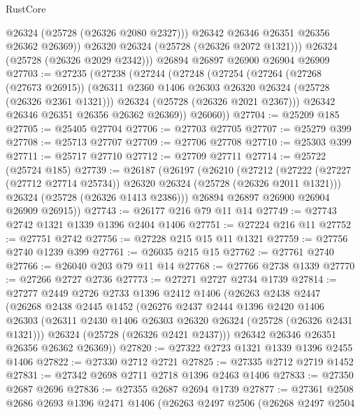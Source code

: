 \begin{lexlean}{RustCore}
\begin{coremodule}
              @26324
              (@25728 (@26326 @2080 @2327)))
            @26342
            @26346
            @26351
            @26356
            @26362
            @26369))
        @26320
        @26324
        (@25728 (@26326 @2072 @1321)))
      @26324
      (@25728 (@26326 @2029 @2342)))
    @26894
    @26897
    @26900
    @26904
    @26909
@27703 := @27235
    (@27238
      (@27244
        (@27248
          (@27254
            (@27264
              (@27268 (@27673 @26915))
              (@26311 @2360 @1406 @26303 @26320 @26324 (@25728 (@26326 @2361 @1321)))
              @26324
              (@25728 (@26326 @2021 @2367)))
            @26342
            @26346
            @26351
            @26356
            @26362
            @26369))
        @26060))
@27704 := @25209 @185
@27705 := @25405 @27704
@27706 := @27703 @27705
@27707 := @25279 @399
@27708 := @25713 @27707
@27709 := @27706 @27708
@27710 := @25303 @399
@27711 := @25717 @27710
@27712 := @27709 @27711
@27714 := @25722 (@25724 @185)
@27739 := @26187
    (@26197
      (@26210
        (@27212
          (@27222 (@27227 (@27712 @27714 @25734)) @26320 @26324 (@25728 (@26326 @2011 @1321)))
          @26324
          (@25728 (@26326 @1413 @2386)))
        @26894
        @26897
        @26900
        @26904
        @26909
        @26915))
@27743 := @26177 @216 @79 @11 @14
@27749 := @27743 @2742 @1321 @1339 @1396 @2404 @1406
@27751 := @27224 @216 @11
@27752 := @27751 @2742
@27756 := @27228 @215 @15 @11 @1321
@27759 := @27756 @2740 @1239 @399
@27761 := @26035 @215 @15
@27762 := @27761 @2740
@27766 := @26040 @203 @79 @11 @14
@27768 := @27766 @2738 @1339
@27770 := @27266 @2727 @2736
@27773 := @27271 @2727 @2734 @1739
@27814 := @27277
    @2449
    @2726
    @2733
    @1396
    @2412
    @1406
    (@26263
      @2438
      @2447
      (@26268
        @2438
        @2445
        @1452
        (@26276
          @2437
          @2444
          @1396
          @2420
          @1406
          @26303
          (@26311 @2430 @1406 @26303 @26320 @26324 (@25728 (@26326 @2431 @1321)))
          @26324
          (@25728 (@26326 @2421 @2437)))
        @26342
        @26346
        @26351
        @26356
        @26362
        @26369))
@27820 := @27322 @2723 @1321 @1339 @1396 @2455 @1406
@27822 := @27330 @2712 @2721
@27825 := @27335 @2712 @2719 @1452
@27831 := @27342 @2698 @2711 @2718 @1396 @2463 @1406
@27833 := @27350 @2687 @2696
@27836 := @27355 @2687 @2694 @1739
@27877 := @27361
    @2508
    @2686
    @2693
    @1396
    @2471
    @1406
    (@26263
      @2497
      @2506
      (@26268
        @2497
        @2504

\end{coremodule}
\end{lexlean}
